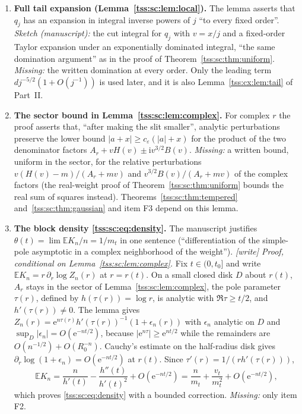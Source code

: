 \documentclass[11pt]{article}
\theoremstyle{remark}\newtheorem{remark}[theorem]{Remark}
\theoremstyle{definition}\newtheorem{definition}[theorem]{Definition}
\newcommand{\ii}{\mathrm i}
\newcommand{\e}{\mathrm e}
\newcommand{\E}{\mathbb E}
\begin{document}
\begin{enumerate}[label=\textbf{F\arabic*.},leftmargin=*]
\item \textbf{Full tail expansion (Lemma~\ref{tss:sc:lem:local}).} The
lemma asserts that $q_j$ has an expansion in integral inverse powers of
$j$ ``to every fixed order''. \emph{Sketch (manuscript):} the cut integral
for $q_j$ with $v=x/j$ and a fixed-order Taylor expansion under an
exponentially dominated integral, ``the same domination argument'' as in
the proof of Theorem~\ref{tss:sc:thm:uniform}. \emph{Missing:} the written
domination at every order. Only the leading term $dj^{-5/2}(1+O(j^{-1}))$
is used later, and it is also Lemma~\ref{tss:cx:lem:tail} of Part~II.

\item \textbf{The sector bound in Lemma~\ref{tss:sc:lem:complex}.} For
complex $r$ the proof asserts that, ``after making the slit smaller'',
analytic perturbations preserve the lower bound
$|a+x|\ge c_\varepsilon(|a|+x)$ for the product of the two denominator
factors $A_r+vH(v)\pm\ii v^{3/2}B(v)$. \emph{Missing:} a written bound,
uniform in the sector, for the relative perturbations $v(H(v)-m)/(A_r+mv)$
and $v^{3/2}B(v)/(A_r+mv)$ of the complex factors (the real-weight proof of
Theorem~\ref{tss:sc:thm:uniform} bounds the real sum of squares instead).
Theorems~\ref{tss:sc:thm:tempered} and~\ref{tss:sc:thm:gaussian} and item
F3 depend on this lemma.

\item \textbf{The block density \eqref{tss:sc:eq:density}.} The
manuscript justifies $\theta(t)=\lim\E K_n/n=1/m_t$ in one sentence
(``differentiation of the simple-pole asymptotic in a complex neighborhood
of the weight''). \emph{[write] Proof, conditional on
Lemma~\ref{tss:sc:lem:complex}.} Fix $t\in(0,t_0]$ and write
$\E K_n=r\,\partial_r\log Z_n(r)$ at $r=r(t)$. On a small closed disk $D$
about $r(t)$, $A_r$ stays in the sector of Lemma~\ref{tss:sc:lem:complex},
the pole parameter $\tau(r)$, defined by $h(\tau(r))=\log r$, is analytic
with $\Re\tau\ge t/2$, and $h'(\tau(r))\neq0$. The lemma gives
$Z_n(r)=\e^{n\tau(r)}h'(\tau(r))^{-1}(1+\epsilon_n(r))$ with $\epsilon_n$
analytic on $D$ and $\sup_D|\epsilon_n|=O(\e^{-nt/2})$, because
$|\e^{n\tau}|\ge\e^{nt/2}$ while the remainders are $O(n^{-1/2})+O(R_0^{-n})$.
Cauchy's estimate on the half-radius disk gives
$\partial_r\log(1+\epsilon_n)=O(\e^{-nt/2})$ at $r(t)$. Since
$\tau'(r)=1/(rh'(\tau(r)))$,
\[
 \E K_n=\frac{n}{h'(t)}-\frac{h''(t)}{h'(t)^2}+O(\e^{-nt/2})
       =\frac{n}{m_t}+\frac{v_t}{m_t^2}+O(\e^{-nt/2}),
\]
which proves \eqref{tss:sc:eq:density} with a bounded correction.
\emph{Missing:} only item F2.


\end{enumerate}
\end{document}

